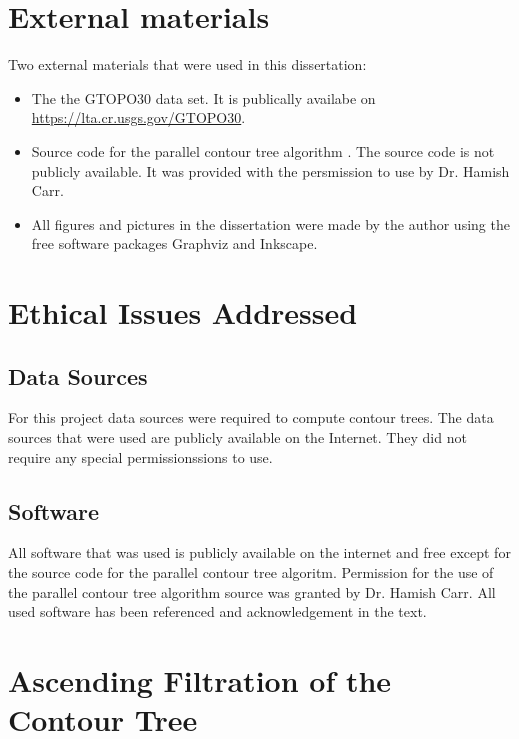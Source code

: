 \begin{appendices}


\chapter{External materials}

Two external materials that were used in this dissertation:

\begin{itemize}
    \item The the GTOPO30 \cite{gtopo} data set. It is publically availabe on \url{https://lta.cr.usgs.gov/GTOPO30}.
    \item Source code for the parallel contour tree algorithm \cite{parallel-peak-pruning}. The source code is not publicly available. It was provided with the persmission to use by Dr. Hamish Carr.
    \item All figures and pictures in the dissertation were made by the author using the free software packages Graphviz and Inkscape.
\end{itemize}

\chapter{Ethical Issues Addressed}
\label{chapter-ethical}

\section{Data Sources}
For this project data sources were required to compute contour trees. The data sources that were used are publicly available on the Internet. They did not require any special permissionssions to use.

\section{Software}
All software that was used is publicly available on the internet and free except for the source code for the parallel contour tree algoritm. Permission for the use of the parallel contour tree algorithm source was granted by Dr. Hamish Carr. All used software has been referenced and acknowledgement in the text.

\chapter{Ascending Filtration of the Contour Tree}
\label{chapter-asc}


\end{appendices}
